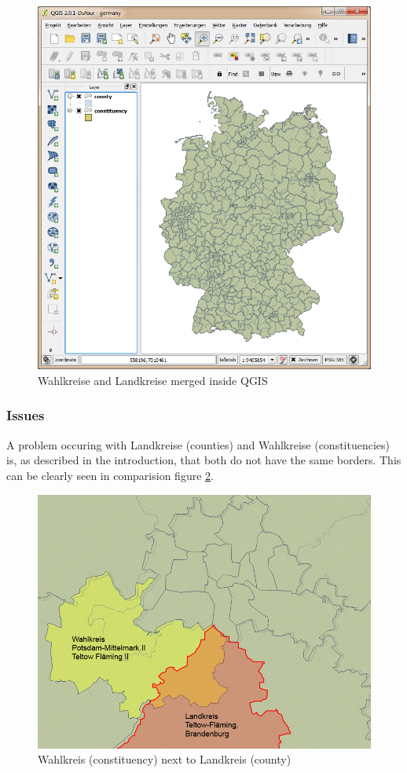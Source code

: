 \begin{figure}[htbp]
\centering
\includegraphics[width=1.1\textwidth]{../img/K4GjcyV.png}
\caption{Wahlkreise and Landkreise merged inside QGIS}
\label{WahlkreiseNLandkreise1}
\end{figure}

\subsubsection{Issues}\label{issues}

A problem occuring with Landkreise (counties) and Wahlkreise (constituencies)
is, as described in the introduction, that both do not have the same borders.
This can be clearly seen in comparision figure \ref{WahlkreisVLandkreis}.

\begin{figure}[htbp]
\centering
\includegraphics[width=1.1\textwidth]{../img/HdnNLcV.png}
\caption{Wahlkreis (constituency) next to Landkreis (county)}
\label{WahlkreisVLandkreis}
\end{figure}

